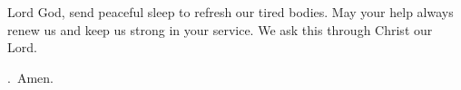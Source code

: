 \lettrine[loversize=0.15,lines=2]{L}{}ord God,
send peaceful sleep
to refresh our tired bodies.
May your help always renew us
and keep us strong in your service.
We ask this through Christ our Lord.
\par \Rbar.~Amen.
